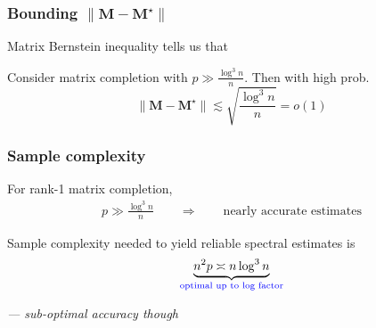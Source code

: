 \documentclass[compress,
mathserif,wide,%
]{beamer}
\begin{document}
\begin{frame}
	\frametitle{Bounding $\|\bm{M} - \bm{M}^\star\|$}
Matrix Bernstein inequality tells us that 
%
\begin{lemma}
\label{lem:perturbation-SBM}
%
Consider matrix completion with $p \gg \frac{\log^{3} n}{n}$. Then with high prob. 
%
\begin{equation}
	\label{eq:MC-perturbation}
	\|\bm{M}-\bm{M}^{\star}\|\lesssim {\sqrt{\frac{\log^{3} n }{n}}} = o(1)
\end{equation}
%
\end{lemma}

	
\end{frame}



\begin{frame}
\frametitle{Sample complexity}

For rank-1 matrix completion, 
%
\begin{align*}
	p\gg \frac{\log^{3}n}{n}  \qquad \Longrightarrow \qquad \text{nearly accurate estimates}
\end{align*}


\vfill

Sample complexity needed to yield reliable spectral estimates is 
%
\[
	\underset{\textcolor{blue}{ \text{optimal up to log factor}}}{\underbrace{ n^2 p \asymp n \log ^3 n  }} 
\]
%


\vfill 

{\hfill \em \footnotesize --- sub-optimal accuracy though}

\end{frame}
\end{document}
